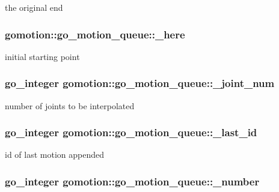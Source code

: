the original end \hypertarget{structgomotion_1_1go__motion__queue_a9df9c96ad6bbcbb60c0c58754790d83b}{
\subsubsection[{\-\_\-here}]{ gomotion\-::go\-\_\-motion\-\_\-queue\-::\-\_\-here\hspace{0.3cm}{\ttfamily [protected]}}}\label{structgomotion_1_1go__motion__queue_a9df9c96ad6bbcbb60c0c58754790d83b}
initial starting point \hypertarget{structgomotion_1_1go__motion__queue_ab1ba219a6f370e7df6495ca0fd958108}{
\subsubsection[{\-\_\-joint\-\_\-num}]{\setlength{\rightskip}{0pt plus 5cm}go\-\_\-integer gomotion\-::go\-\_\-motion\-\_\-queue\-::\-\_\-joint\-\_\-num\hspace{0.3cm}{\ttfamily [protected]}}}\label{structgomotion_1_1go__motion__queue_ab1ba219a6f370e7df6495ca0fd958108}
number of joints to be interpolated \hypertarget{structgomotion_1_1go__motion__queue_aeba2a7bb2b6dd7076aed9cc51904f312}{
\subsubsection[{\-\_\-last\-\_\-id}]{\setlength{\rightskip}{0pt plus 5cm}go\-\_\-integer gomotion\-::go\-\_\-motion\-\_\-queue\-::\-\_\-last\-\_\-id\hspace{0.3cm}{\ttfamily [protected]}}}\label{structgomotion_1_1go__motion__queue_aeba2a7bb2b6dd7076aed9cc51904f312}
id of last motion appended \hypertarget{structgomotion_1_1go__motion__queue_a1c1fe7f38ef5ba8523d251d2199a19e3}{
\subsubsection[{\-\_\-number}]{\setlength{\rightskip}{0pt plus 5cm}go\-\_\-integer gomotion\-::go\-\_\-motion\-\_\-queue\-::\-\_\-number\hspace{0.3cm}{\ttfamily [protected]}}}\label{structgomotion_1_1go__motion__queue_a1c1fe7f38ef5ba8523d251d2199a19e3}
